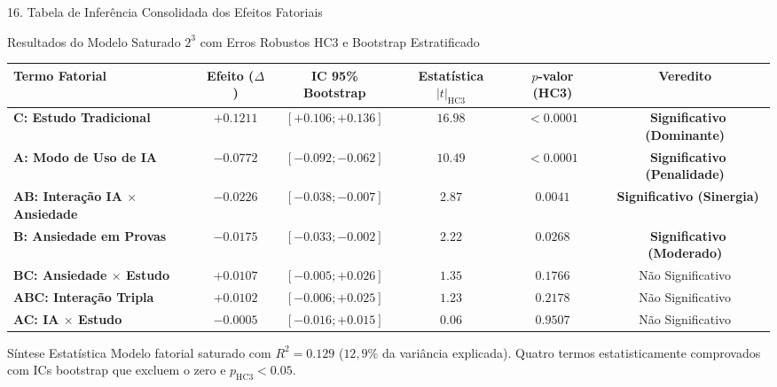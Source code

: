 \documentclass[aspectratio=169, 10pt]{beamer}
\newcommand{\cmark}{\textcolor{StatusGreen}{\ding{51}}}
\begin{document}
\begin{frame}{16. Tabela de Inferência Consolidada dos Efeitos Fatoriais}
    \begin{block}{Resultados do Modelo Saturado $2^3$ com Erros Robustos HC3 e Bootstrap Estratificado}
        \centering \small
        \renewcommand{\arraystretch}{1.12}
        \begin{tabular}{l c c c c c}
            \toprule
            \textbf{Termo Fatorial} & \textbf{Efeito ($\Delta$)} & \textbf{IC 95\% Bootstrap} & \textbf{Estatística $|t|_{\text{HC3}}$} & \textbf{$p$-valor (HC3)} & \textbf{Veredito} \\
            \midrule
            \rowcolor{SoftBlue!40}
            \textbf{C: Estudo Tradicional} & $\mathbf{+0.1211}$ & $[+0.106; +0.136]$ & $16.98$ & $< 0.0001$ & \cmark\ \textbf{Significativo (Dominante)} \\
            \rowcolor{SoftBlue!40}
            \textbf{A: Modo de Uso de IA} & $\mathbf{-0.0772}$ & $[-0.092; -0.062]$ & $10.49$ & $< 0.0001$ & \cmark\ \textbf{Significativo (Penalidade)} \\
            \rowcolor{SoftBlue!40}
            \textbf{AB: Interação IA $\times$ Ansiedade} & $\mathbf{-0.0226}$ & $[-0.038; -0.007]$ & $2.87$ & $0.0041$ & \cmark\ \textbf{Significativo (Sinergia)} \\
            \rowcolor{SoftBlue!40}
            \textbf{B: Ansiedade em Provas} & $\mathbf{-0.0175}$ & $[-0.033; -0.002]$ & $2.22$ & $0.0268$ & \cmark\ \textbf{Significativo (Moderado)} \\
            \midrule
            \textbf{BC: Ansiedade $\times$ Estudo} & $+0.0107$ & $[-0.005; +0.026]$ & $1.35$ & $0.1766$ & Não Significativo \\
            \textbf{ABC: Interação Tripla} & $+0.0102$ & $[-0.006; +0.025]$ & $1.23$ & $0.2178$ & Não Significativo \\
            \textbf{AC: IA $\times$ Estudo} & $-0.0005$ & $[-0.016; +0.015]$ & $0.06$ & $0.9507$ & Não Significativo \\
            \bottomrule
        \end{tabular}
    \end{block}

    \vspace{2pt}

    \begin{exampleblock}{Síntese Estatística}
        \small
        Modelo fatorial saturado com $R^2 = 0.129$ ($12,9\%$ da variância explicada). Quatro termos estatisticamente comprovados com ICs bootstrap que excluem o zero e $p_{\text{HC3}} < 0.05$.
    \end{exampleblock}
\end{frame}
\end{document}
